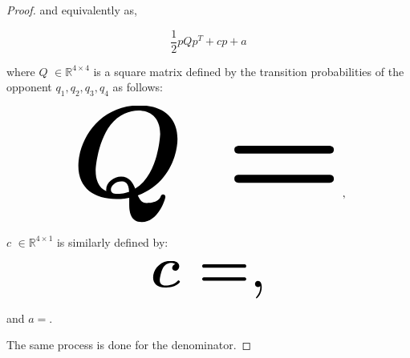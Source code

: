\documentclass[10pt]{article}
\newcommand{\R}{\mathbb{R}}
\begin{document}
\begin{proof}
    and equivalently as,
    
    \[\frac{1}{2}pQp^T + cp + a\]
    
    where \(Q\) \(\in \R^{4\times4}\) is a square matrix defined by the
    transition probabilities of the opponent \(q_1, q_2, q_3, q_4\) as follows:
    
    \begin{equation*}
        \resizebox{0.7\linewidth}{!}{\arraycolsep=2.5pt%
        \boldmath\(
        Q = \)},
    \end{equation*}
    
    \(c\) \(\in \R^{4 \times 1}\) is similarly defined by:
    
    \begin{equation*}
        \resizebox{0.3\linewidth}{!}{\arraycolsep=2.5pt%
        \boldmath\(c = \),}
    \end{equation*}
    
    and \(a = \).
    
    The same process is done for the denominator.
\end{proof}
\end{document}

